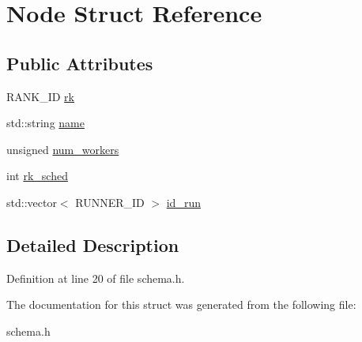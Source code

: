 \hypertarget{structNode}{
\section{Node Struct Reference}
\label{structNode}
}
\subsection*{Public Attributes}
\begin{CompactItemize}
\item 
\hypertarget{structNode_7de6f254b6b8c3f9f8287af0bb742e9b}{
RANK\_\-ID \hyperlink{structNode_7de6f254b6b8c3f9f8287af0bb742e9b}{rk}}
\label{structNode_7de6f254b6b8c3f9f8287af0bb742e9b}

\item 
\hypertarget{structNode_3c4318d71ca9a44fe33edcf8b7f26863}{
std::string \hyperlink{structNode_3c4318d71ca9a44fe33edcf8b7f26863}{name}}
\label{structNode_3c4318d71ca9a44fe33edcf8b7f26863}

\item 
\hypertarget{structNode_01fec86d75332858b158c810d57caee3}{
unsigned \hyperlink{structNode_01fec86d75332858b158c810d57caee3}{num\_\-workers}}
\label{structNode_01fec86d75332858b158c810d57caee3}

\item 
\hypertarget{structNode_98deed2036c3dd8fc0f4fe8dacf56a92}{
int \hyperlink{structNode_98deed2036c3dd8fc0f4fe8dacf56a92}{rk\_\-sched}}
\label{structNode_98deed2036c3dd8fc0f4fe8dacf56a92}

\item 
\hypertarget{structNode_a90013b890888d3d252a71cb4fe48934}{
std::vector$<$ RUNNER\_\-ID $>$ \hyperlink{structNode_a90013b890888d3d252a71cb4fe48934}{id\_\-run}}
\label{structNode_a90013b890888d3d252a71cb4fe48934}

\end{CompactItemize}


\subsection{Detailed Description}




Definition at line 20 of file schema.h.

The documentation for this struct was generated from the following file:\begin{CompactItemize}
\item 
schema.h\end{CompactItemize}
